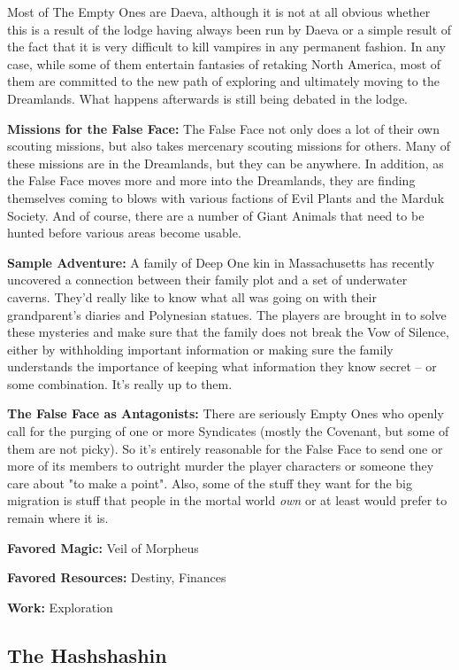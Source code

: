Most of The Empty Ones are Daeva, although it is not at all obvious whether this is a result of the lodge having always been run by Daeva or a simple result of the fact that it is very difficult to kill vampires in any permanent fashion. In any case, while some of them entertain fantasies of retaking North America, most of them are committed to the new path of exploring and ultimately moving to the Dreamlands. What happens afterwards is still being debated in the lodge.

\textbf{Missions for the False Face:} The False Face not only does a lot of their own scouting missions, but also takes mercenary scouting missions for others. Many of these missions are in the Dreamlands, but they can be anywhere. In addition, as the False Face moves more and more into the Dreamlands, they are finding themselves coming to blows with various factions of Evil Plants and the Marduk Society. And of course, there are a number of Giant Animals that need to be hunted before various areas become usable.

\textbf{Sample Adventure:} A family of Deep One kin in Massachusetts has recently uncovered a connection between their family plot and a set of underwater caverns. They'd really like to know what all was going on with their grandparent's diaries and Polynesian statues. The players are brought in to solve these mysteries and make sure that the family does not break the Vow of Silence, either by withholding important information or making sure the family understands the importance of keeping what information they know secret -- or some combination. It's really up to them.

\textbf{The False Face as Antagonists:} There are seriously Empty Ones who openly call for the purging of one or more Syndicates (mostly the Covenant, but some of them are not picky). So it's entirely reasonable for the False Face to send one or more of its members to outright murder the player characters or someone they care about "to make a point". Also, some of the stuff they want for the big migration is stuff that people in the mortal world \textit{own} or at least would prefer to remain where it is.

\textbf{Favored Magic:}  Veil of Morpheus

\textbf{Favored Resources:} Destiny, Finances

\textbf{Work:} Exploration

\subsection{The Hashshashin} 

